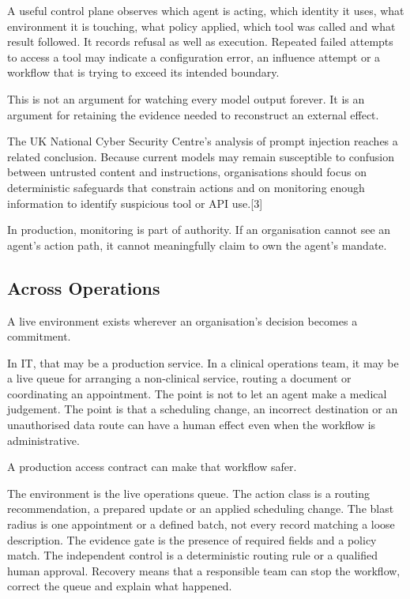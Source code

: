 A useful control plane observes which agent is acting, which identity it
uses, what environment it is touching, what policy applied, which tool
was called and what result followed. It records refusal as well as
execution. Repeated failed attempts to access a tool may indicate a
configuration error, an influence attempt or a workflow that is trying
to exceed its intended boundary.

This is not an argument for watching every model output forever. It is
an argument for retaining the evidence needed to reconstruct an external
effect.

The UK National Cyber Security Centre's analysis of prompt injection
reaches a related conclusion. Because current models may remain
susceptible to confusion between untrusted content and instructions,
organisations should focus on deterministic safeguards that constrain
actions and on monitoring enough information to identify suspicious tool
or API use.{[}3{]}

In production, monitoring is part of authority. If an organisation
cannot see an agent's action path, it cannot meaningfully claim to own
the agent's mandate.

\subsection{Across Operations}\label{across-operations}

A live environment exists wherever an organisation's decision becomes a
commitment.

In IT, that may be a production service. In a clinical operations team,
it may be a live queue for arranging a non-clinical service, routing a
document or coordinating an appointment. The point is not to let an
agent make a medical judgement. The point is that a scheduling change,
an incorrect destination or an unauthorised data route can have a human
effect even when the workflow is administrative.

A production access contract can make that workflow safer.

The environment is the live operations queue. The action class is a
routing recommendation, a prepared update or an applied scheduling
change. The blast radius is one appointment or a defined batch, not
every record matching a loose description. The evidence gate is the
presence of required fields and a policy match. The independent control
is a deterministic routing rule or a qualified human approval. Recovery
means that a responsible team can stop the workflow, correct the queue
and explain what happened.

